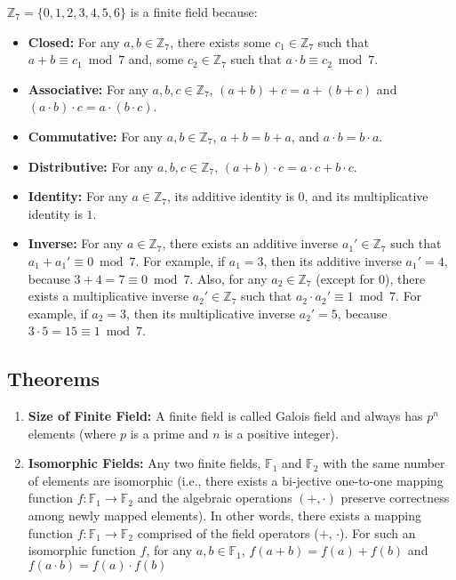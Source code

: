 \noindent $\mathbb{Z}_7 = \{0, 1, 2, 3, 4, 5, 6\}$ is a finite field because:
\begin{itemize}
\item \textbf{Closed:} For any $a, b \in \mathbb{Z}_7$, there exists some $c_1 \in \mathbb{Z}_7$ such that $a + b \equiv c_1 \bmod 7$ and, some $c_2 \in \mathbb{Z}_7$ such that $a \cdot b \equiv c_2 \bmod 7$.
\item \textbf{Associative:} For any $a, b, c \in \mathbb{Z}_7$, $ (a + b) + c = a + (b + c)$ and $(a \cdot b) \cdot c = a \cdot (b \cdot c)$.
\item \textbf{Commutative:} For any $a, b \in \mathbb{Z}_7$, $ a + b = b + a$, and $a \cdot b = b \cdot a$.
\item \textbf{Distributive:} For any $a, b, c \in \mathbb{Z}_7$, $ (a + b) \cdot c = a \cdot c + b \cdot c$.
\item \textbf{Identity:} For any $a \in \mathbb{Z}_7$, its additive identity is $0$, and its multiplicative identity is $1$.
\item \textbf{Inverse:} For any $a \in \mathbb{Z}_7$, there exists an additive inverse $a_1' \in \mathbb{Z}_7$ such that $a_1 + a_1' \equiv 0 \bmod 7$. For example, if $a_1 = 3$, then its additive inverse $a_1' = 4$, because $3 + 4 = 7 \equiv 0 \bmod 7$. Also, for any $a_2 \in \mathbb{Z}_7$ (except for 0), there exists a multiplicative inverse $a_2' \in \mathbb{Z}_7$ such that $a_2 \cdot a_2' \equiv 1 \bmod 7$. For example, if $a_2 = 3$, then its multiplicative inverse $a_2' = 5$, because $3 \cdot 5 = 15 \equiv 1 \bmod 7$. 
\end{itemize}

\subsection{Theorems}
\label{subsec:field-theorem}

\begin{tcolorbox}[title={\textbf{\tboxtheorem{\ref*{subsec:field-theorem}} Field Theorems}}]
\begin{enumerate}
\item \textbf{Size of Finite Field:} A finite field is called Galois field and always has $p^n$ elements (where $p$ is a prime and $n$ is a positive integer).
\item \textbf{Isomorphic Fields:} Any two finite fields, $\mathbb{F}_1$ and $\mathbb{F}_2$ with the same number of elements are isomorphic (i.e., there exists a bi-jective one-to-one mapping function $f : \mathbb{F}_1 \rightarrow \mathbb{F}_2$ and the algebraic operations $(+, \cdot)$ preserve correctness among newly mapped elements). In other words, there exists a mapping function $f : \mathbb{F}_1 \rightarrow \mathbb{F}_2$ comprised of the field operators ($+$, $\cdot$). For such an isomorphic function $f$, for any $a, b \in \mathbb{F}_1$, $f(a+b) = f(a) + f(b)$ and $f(a \cdot b) = f(a) \cdot f(b)$
\end{enumerate}
\end{tcolorbox}



